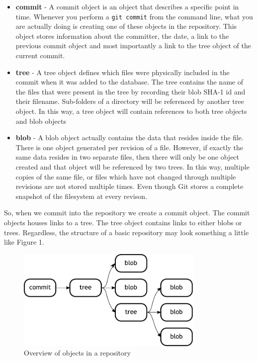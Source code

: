 \begin{itemize}
\item\textbf{commit} - A commit object is an object that describes a specific point in time.  Whenever you perform a \texttt{git commit} from the command line, what you are actually doing is creating one of these objects in the repository.  This object stores information about the committer, the date, a link to the previous commit object and most importantly a link to the tree object of the current commit.
\item\textbf{tree} - A tree object defines which files were physically included in the commit when it was added to the database.  The tree contains the name of the files that were present in the tree by recording their blob SHA-1 id and their filename.  Sub-folders of a directory will be referenced by another tree object.  In this way, a tree object will contain references to both tree objects and blob objects
\item\textbf{blob} - A blob object actually contains the data that resides inside the file.  There is one object generated per revision of a file.  However, if exactly the same data resides in two separate files, then there will only be one object created and that object will be referenced by two trees.  In this way, multiple copies of the same file, or files which have not changed through multiple revisions are not stored multiple times.  Even though Git stores a complete snapshot of the filesystem at every revison.
\end{itemize}

So, when we commit into the repository we create a commit object.  The commit objects houses links to a tree.  The tree object contains links to either blobs or trees.  Regardless, the structure of a basic repository may look something a little like Figure 1.

\begin{figure}[hbt]
\centering
\includegraphics[width=9cm]{images/f-af2-d1.pdf}
\caption{Overview of objects in a repository}
\end{figure}

